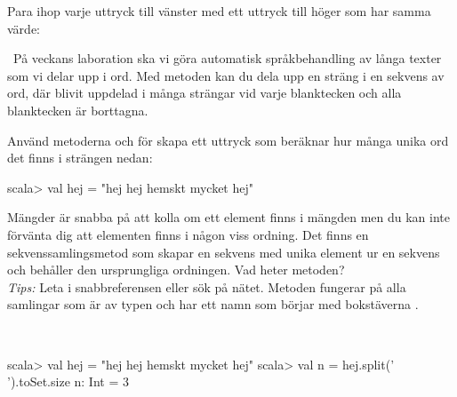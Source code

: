 \QUESTEND



\QUESTBEGIN

\Task \what

\vspace{1em}\noindent Para ihop varje uttryck till vänster med ett uttryck till höger som har samma värde:

\begin{ConceptConnections}

\end{ConceptConnections}

\SOLUTION

\TaskSolved \what

\begin{ConceptConnections}

\end{ConceptConnections}

\QUESTEND



\QUESTBEGIN

\Task \what~På veckans laboration ska vi göra automatisk språkbehandling av långa texter som vi delar upp i ord. Med metoden  kan du dela upp en sträng  i en sekvens av ord, där  blivit uppdelad i många strängar vid varje blanktecken och alla blanktecken är borttagna.

\Subtask Använd metoderna  och  för skapa ett uttryck som beräknar hur många unika ord det finns i strängen  nedan:
\begin{REPLnonum}
scala> val hej = "hej hej hemskt mycket hej"
\end{REPLnonum}

\Subtask Mängder är snabba på att kolla om ett element finns i mängden men du kan inte förvänta dig att elementen finns i någon viss ordning. Det finns en sekvenssamlingsmetod som skapar en sekvens med unika element ur en sekvens och behåller den ursprungliga ordningen. Vad heter metoden? \\\emph{Tips:} Leta i snabbreferensen eller sök på nätet. Metoden fungerar på alla samlingar som är av typen  och har ett namn som börjar med bokstäverna .

\SOLUTION

\TaskSolved \what~

\SubtaskSolved
\begin{REPL}
scala> val hej = "hej hej hemskt mycket hej"
scala> val n = hej.split(' ').toSet.size
n: Int = 3
\end{REPL}

